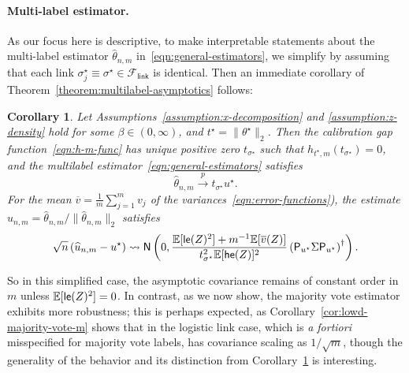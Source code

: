 \documentclass[11pt]{article}
\newcommand{\E}{\mathbb{E}}
\newcommand{\prn}[1]{\left({#1}\right)} %
\newcommand{\what}[1]{\widehat{#1}}
\newcommand{\wb}[1]{\overline{#1}}
\newcommand{\normal}{\mathsf{N}}
\newcommand{\lr}{^{\textup{lr}}}
\newcommand{\mv}{^{\textup{mv}}}
\newcommand{\proj}{\mathsf{P}}
\newcommand{\flink}{\mathcal{F}_{\mathsf{link}}}
\newcommand{\norms}[1]{\|{#1}\|} %
\newcommand{\ltwos}[1]{\norms{#1}_2} %
\newcommand{\<}{\langle} %
\renewcommand{\>}{\rangle}
\newcommand{\cd}{\rightsquigarrow}
\newcommand{\cp}{\stackrel{p}{\rightarrow}}
\newcommand{\opt}{^\star}
\newcommand{\gme}{\what{\theta}_{n,m}} %
\newcommand{\tmle}{\what{\theta}\lr_{n,m}} %
\newcommand{\mve}{\what{\theta}\mv_{n,m}} %
\newtheorem{corollary}{Corollary}
\begin{document}


\paragraph{Multi-label estimator.}
As our focus here is descriptive, to make interpretable statements about
the multi-label estimator $\gme$ in~\eqref{eqn:general-estimators}, we
simplify by assuming that each link $\sigma_j\opt \equiv \sigma\opt \in
\flink$ is identical.
Then an immediate corollary of Theorem~\ref{theorem:multilabel-asymptotics}
follows:
\begin{corollary}
  \label{corollary:lowd-misspcfd-logistic-regression}
  Let Assumptions~\ref{assumption:x-decomposition} and
  \ref{assumption:z-density} hold for some $\beta \in (0, \infty)$, and
  $t\opt = \ltwos{\theta\opt}$. Then the calibration
  gap function~\eqref{eqn:h-m-func} has unique positive zero
  $t_{\sigma\opt}$ such that
  $h_{t\opt,m}(t_{\sigma\opt}) = 0$, and the multilabel
  estimator~\eqref{eqn:general-estimators} satisfies
  \begin{equation*}
    \gme \cp  t_{\sigma\opt} u\opt.
  \end{equation*}
  For the mean $\wb{v} = \frac{1}{m} \sum_{j = 1}^m v_j$ of the
  variances~\eqref{eqn:error-functions}), the estimate
  $\what{u}_{n,m} = \gme / \ltwos{\gme}$ satisfies
  \begin{equation*}
    \sqrt{n} \left(\what{u}_{n,m} - u\opt\right)
    \cd \normal\left(0,
    \frac{\E[\linkerr(Z)^2]  + m^{-1} \E[\wb{v}(Z)]}{t_{\sigma\opt}^2
      \E[\hessfunc(Z)]^2}  
    \prn{\proj_{u\opt} \Sigma \proj_{u\opt}}^\dagger\right)  .
  \end{equation*}
\end{corollary}

So in this simplified case, the asymptotic covariance remains of constant
order in $m$ unless $\E[\linkerr(Z)^2] = 0$.  In contrast, as we now show,
the majority vote estimator exhibits more robustness; this is perhaps
expected, as Corollary~\ref{cor:lowd-majority-vote-m} shows that in the
logistic link case, which is \emph{a fortiori} misspecified for majority
vote labels, has covariance scaling as $1/\sqrt{m}$, though the
generality of the behavior and its distinction from
Corollary~\ref{corollary:lowd-misspcfd-logistic-regression}
is interesting.
\end{document}
